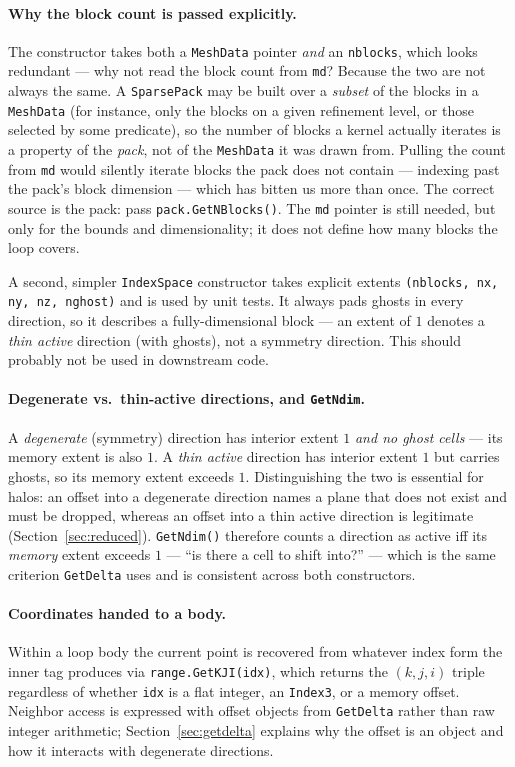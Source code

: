 \documentclass[11pt]{article}
\newcommand{\code}[1]{\lstinline[basicstyle=\ttfamily]|#1|}
\newcommand{\codelbl}[1]{\texttt{#1}}
\begin{document}
\paragraph{Why the block count is passed explicitly.} The constructor takes both a
\code{MeshData} pointer \emph{and} an \code{nblocks}, which looks redundant --- why
not read the block count from \code{md}? Because the two are not always the same.
A \code{SparsePack} may be built over a \emph{subset} of the blocks in a
\code{MeshData} (for instance, only the blocks on a given refinement level, or
those selected by some predicate), so the number of blocks a kernel actually
iterates is a property of the \emph{pack}, not of the \code{MeshData} it was drawn
from. Pulling the count from \code{md} would silently iterate blocks the pack does
not contain --- indexing past the pack's block dimension --- which has bitten us
more than once. The correct source is the pack: pass \code{pack.GetNBlocks()}. The
\code{md} pointer is still needed, but only for the bounds and dimensionality; it
does not define how many blocks the loop covers.

A second, simpler \code{IndexSpace} constructor takes explicit extents
\code{(nblocks, nx, ny, nz, nghost)} and is used by unit tests. It always pads
ghosts in every direction, so it describes a fully-dimensional block --- an extent
of $1$ denotes a \emph{thin active} direction (with ghosts), not a symmetry
direction. This should probably not be used in downstream code. 

\paragraph{Degenerate vs.\ thin-active directions, and \codelbl{GetNdim}.} A
\emph{degenerate} (symmetry) direction has interior extent $1$ \emph{and no ghost
cells} --- its memory extent is also $1$. A \emph{thin active} direction has
interior extent $1$ but carries ghosts, so its memory extent exceeds $1$.
Distinguishing the two is essential for halos: an offset into a degenerate
direction names a plane that does not exist and must be dropped, whereas an offset
into a thin active direction is legitimate (Section~\ref{sec:reduced}).
\code{GetNdim()} therefore counts a direction as active iff its \emph{memory}
extent exceeds $1$ --- ``is there a cell to shift into?'' --- which is the same
criterion \code{GetDelta} uses and is consistent across both constructors.

\paragraph{Coordinates handed to a body.} Within a loop body the current point is
recovered from whatever index form the inner tag produces via
\code{range.GetKJI(idx)}, which returns the $(k,j,i)$ triple regardless of whether
\code{idx} is a flat integer, an \code{Index3}, or a memory offset. Neighbor
access is expressed with offset objects from \code{GetDelta} rather than raw
integer arithmetic; Section~\ref{sec:getdelta} explains why the offset is an
object and how it interacts with degenerate directions.
\end{document}
